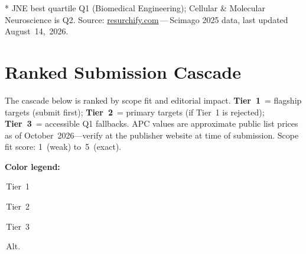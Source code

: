 \documentclass[a4paper,11pt]{article}
\begin{document}
\smallskip
{\footnotesize
  * JNE best quartile Q1 (Biomedical Engineering); Cellular \& Molecular Neuroscience is Q2.
  Source: \href{https://www.resurchify.com}{resurchify.com}\,---\,Scimago 2025 data,
  last updated August~14,~2026.}

\section{Ranked Submission Cascade}

The cascade below is ranked by scope fit and editorial impact.
\textbf{Tier~1}~= flagship targets (submit first);
\textbf{Tier~2}~= primary targets (if Tier~1 is rejected);
\textbf{Tier~3}~= accessible Q1 fallbacks.
APC values are approximate public list prices as of October~2026---verify at the
publisher website at time of submission.
Scope fit score: 1~(weak) to~5~(exact).

\medskip
\noindent\textbf{Color legend:}\quad
\colorbox{tier1bg}{\strut\,Tier~1\,}\;
\colorbox{tier2bg}{\strut\,Tier~2\,}\;
\colorbox{tier3bg}{\strut\,Tier~3\,}\;
\colorbox{altbg}{\strut\,Alt.\,}
\end{document}
